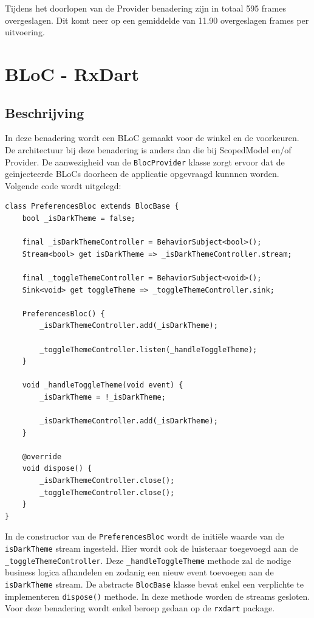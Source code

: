 Tijdens het doorlopen van de Provider benadering zijn in totaal 595 frames overgeslagen. Dit komt neer op een gemiddelde van 11.90 overgeslagen frames per uitvoering.

\section{BLoC - RxDart}
\subsection{Beschrijving}
In deze benadering wordt een BLoC gemaakt voor de winkel en de voorkeuren. De architectuur bij deze benadering is anders dan die bij ScopedModel en/of Provider. 
De aanwezigheid van de \verb|BlocProvider| klasse zorgt ervoor dat de geïnjecteerde BLoCs doorheen de applicatie opgevraagd kunnnen worden. 
Volgende code wordt uitgelegd:

\begin{verbatim}
class PreferencesBloc extends BlocBase {
    bool _isDarkTheme = false;
    
    final _isDarkThemeController = BehaviorSubject<bool>();
    Stream<bool> get isDarkTheme => _isDarkThemeController.stream;
    
    final _toggleThemeController = BehaviorSubject<void>();
    Sink<void> get toggleTheme => _toggleThemeController.sink;
    
    PreferencesBloc() {
        _isDarkThemeController.add(_isDarkTheme);
    
        _toggleThemeController.listen(_handleToggleTheme);
    }
    
    void _handleToggleTheme(void event) {
        _isDarkTheme = !_isDarkTheme;
    
        _isDarkThemeController.add(_isDarkTheme);
    }
    
    @override
    void dispose() {
        _isDarkThemeController.close();
        _toggleThemeController.close();
    }
}
\end{verbatim}
In de constructor van de \verb|PreferencesBloc| wordt de initiële waarde van de \verb|isDarkTheme| stream ingesteld. Hier wordt ook de luisteraar toegevoegd aan de \verb|_toggleThemeController|. Deze \verb|_handleToggleTheme| methode zal de nodige business logica afhandelen en zodanig een nieuw event toevoegen aan de \verb|isDarkTheme| stream.
De abstracte \verb|BlocBase| klasse bevat enkel een verplichte te implementeren \verb|dispose()| methode. In deze methode worden de streams gesloten. \newline
Voor deze benadering wordt enkel beroep gedaan op de \verb|rxdart| package. 


